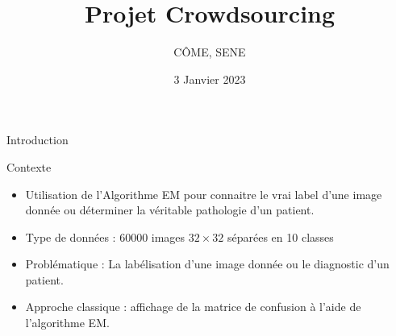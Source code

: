 \documentclass[11pt]{beamer}
\begin{document}
	\author{CÔME, SENE}
	\title[Projet UE HAX916X]{Projet Crowdsourcing}
	\subtitle{}
	\date{3 Janvier 2023}
	\frame{\titlepage}
	
	\begin{frame}{Introduction}
		\begin{block}{Contexte}
			\begin{itemize}
				\item Utilisation de l'Algorithme EM pour connaitre le vrai label d'une image donnée ou déterminer la véritable pathologie d'un patient.
				\item Type de données : 60000 images $32\times32$ séparées en 10 classes
				\item Problématique : La labélisation d'une image donnée ou le diagnostic d'un patient.
				\item Approche classique : affichage de la matrice de confusion à l'aide de l'algorithme EM.
			\end{itemize}
		\end{block}
	\end{frame}
	
	
\end{document}
